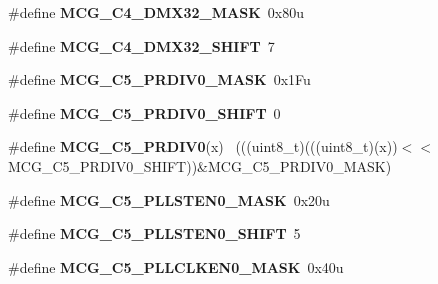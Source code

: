\begin{DoxyCompactItemize}
\item 
\hypertarget{group___m_c_g___register___masks_ga5d16ac35cf87b3cdeeefca1c16a0eda0}{}\#define {\bfseries M\+C\+G\+\_\+\+C4\+\_\+\+D\+M\+X32\+\_\+\+M\+A\+S\+K}~0x80u\label{group___m_c_g___register___masks_ga5d16ac35cf87b3cdeeefca1c16a0eda0}

\item 
\hypertarget{group___m_c_g___register___masks_ga12d73b2d4a4fd1f2fb21a1cbe87aaa83}{}\#define {\bfseries M\+C\+G\+\_\+\+C4\+\_\+\+D\+M\+X32\+\_\+\+S\+H\+I\+F\+T}~7\label{group___m_c_g___register___masks_ga12d73b2d4a4fd1f2fb21a1cbe87aaa83}

\item 
\hypertarget{group___m_c_g___register___masks_ga28ab0b9007f9941707395660db088172}{}\#define {\bfseries M\+C\+G\+\_\+\+C5\+\_\+\+P\+R\+D\+I\+V0\+\_\+\+M\+A\+S\+K}~0x1\+Fu\label{group___m_c_g___register___masks_ga28ab0b9007f9941707395660db088172}

\item 
\hypertarget{group___m_c_g___register___masks_ga452026beec3bec5a580d151e15d83f30}{}\#define {\bfseries M\+C\+G\+\_\+\+C5\+\_\+\+P\+R\+D\+I\+V0\+\_\+\+S\+H\+I\+F\+T}~0\label{group___m_c_g___register___masks_ga452026beec3bec5a580d151e15d83f30}

\item 
\hypertarget{group___m_c_g___register___masks_ga4671734fc6670aae81260260e8af1861}{}\#define {\bfseries M\+C\+G\+\_\+\+C5\+\_\+\+P\+R\+D\+I\+V0}(x)                                              ~(((uint8\+\_\+t)(((uint8\+\_\+t)(x))$<$$<$M\+C\+G\+\_\+\+C5\+\_\+\+P\+R\+D\+I\+V0\+\_\+\+S\+H\+I\+F\+T))\&M\+C\+G\+\_\+\+C5\+\_\+\+P\+R\+D\+I\+V0\+\_\+\+M\+A\+S\+K)\label{group___m_c_g___register___masks_ga4671734fc6670aae81260260e8af1861}

\item 
\hypertarget{group___m_c_g___register___masks_ga9bec4ed23caf6a431b506e944d928080}{}\#define {\bfseries M\+C\+G\+\_\+\+C5\+\_\+\+P\+L\+L\+S\+T\+E\+N0\+\_\+\+M\+A\+S\+K}~0x20u\label{group___m_c_g___register___masks_ga9bec4ed23caf6a431b506e944d928080}

\item 
\hypertarget{group___m_c_g___register___masks_ga486796db598fbf2f07f39d71453f49b6}{}\#define {\bfseries M\+C\+G\+\_\+\+C5\+\_\+\+P\+L\+L\+S\+T\+E\+N0\+\_\+\+S\+H\+I\+F\+T}~5\label{group___m_c_g___register___masks_ga486796db598fbf2f07f39d71453f49b6}

\item 
\hypertarget{group___m_c_g___register___masks_ga73671453b8f8804784e5b7e67551726d}{}\#define {\bfseries M\+C\+G\+\_\+\+C5\+\_\+\+P\+L\+L\+C\+L\+K\+E\+N0\+\_\+\+M\+A\+S\+K}~0x40u\label{group___m_c_g___register___masks_ga73671453b8f8804784e5b7e67551726d}


\end{DoxyCompactItemize}
